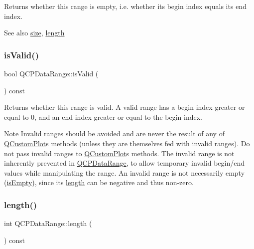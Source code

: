 Returns whether this range is empty, i.\+e. whether its begin index equals its end index.

\begin{DoxySeeAlso}{See also}
\hyperlink{class_q_c_p_data_range_ac6af055e509d1b691c244954ff1c5887}{size}, \hyperlink{class_q_c_p_data_range_a1e7836058f755c6ab9f11996477b7150}{length} 
\end{DoxySeeAlso}
\mbox{\label{class_q_c_p_data_range_aae53a37472212dca0a7939963e20dba0}} 
\subsubsection{\texorpdfstring{is\+Valid()}{isValid()}}
{\footnotesize\ttfamily bool Q\+C\+P\+Data\+Range\+::is\+Valid (\begin{DoxyParamCaption}{ }\end{DoxyParamCaption}) const\hspace{0.3cm}{\ttfamily [inline]}}

Returns whether this range is valid. A valid range has a begin index greater or equal to 0, and an end index greater or equal to the begin index.

\begin{DoxyNote}{Note}
Invalid ranges should be avoided and are never the result of any of \hyperlink{class_q_custom_plot}{Q\+Custom\+Plot}\textquotesingle{}s methods (unless they are themselves fed with invalid ranges). Do not pass invalid ranges to \hyperlink{class_q_custom_plot}{Q\+Custom\+Plot}\textquotesingle{}s methods. The invalid range is not inherently prevented in \hyperlink{class_q_c_p_data_range}{Q\+C\+P\+Data\+Range}, to allow temporary invalid begin/end values while manipulating the range. An invalid range is not necessarily empty (\hyperlink{class_q_c_p_data_range_ac32e53fc05d6cd2eac96b96a7265d3b8}{is\+Empty}), since its \hyperlink{class_q_c_p_data_range_a1e7836058f755c6ab9f11996477b7150}{length} can be negative and thus non-\/zero. 
\end{DoxyNote}
\mbox{\label{class_q_c_p_data_range_a1e7836058f755c6ab9f11996477b7150}} 
\subsubsection{\texorpdfstring{length()}{length()}}
{\footnotesize\ttfamily int Q\+C\+P\+Data\+Range\+::length (\begin{DoxyParamCaption}{ }\end{DoxyParamCaption}) const\hspace{0.3cm}{\ttfamily [inline]}}

